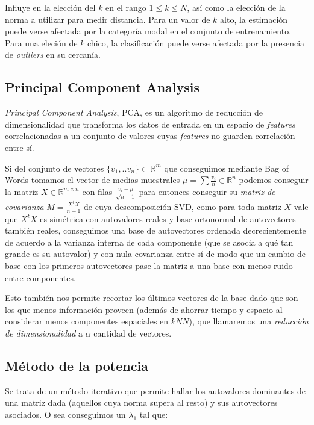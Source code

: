 Influye en \knn{} la elección del $k$ en el rango $1 \leq k \leq N$, así como
la elección de la norma a utilizar para medir distancia.
Para un valor de $k$ alto, la estimación puede verse afectada por la categoría
modal en el conjunto de entrenamiento.
Para una eleción de $k$ chico, la clasificación puede verse afectada por la
presencia de \textit{outliers} en su cercanía.


\subsection{Principal Component Analysis}%
\label{sub:principal_component_analysis}

\textit{Principal Component Analysis}, PCA, es un algoritmo de reducción de
dimensionalidad que transforma los datos de entrada en un espacio de
\textit{features} correlacionadas a un conjunto de valores cuyas
\textit{features} no guarden correlación entre sí.


Si del conjunto de vectores $\{v_1,..v_n \} \subset \mathds{R}^m$ que
conseguimos mediante Bag of Words tomamos el vector de medias
muestrales $\mu = \sum \frac{v_i}{n} \in \mathds{R}^n $ podemos
conseguir la matriz $X \in \mathds{R}^{m\times n}$ con filas
$\frac{v_i-\mu}{\sqrt{n-1}}$ para entonces conseguir su \textit{matriz de
  covarianza} $M=\frac{X^t X}{n-1}$ de cuya descomposición SVD, como
para toda matriz $X$ vale que $X^t X$ es simétrica con autovalores
reales y base ortonormal de autovectores también reales, conseguimos
una base de autovectores ordenada decrecientemente de acuerdo a la
varianza interna de cada componente (que se asocia a qué tan grande es
su autovalor) y con nula covarianza entre sí de modo que un cambio de
base con los primeros autovectores pase la matriz a una base con menos
ruido entre componentes.

Esto también nos permite recortar los últimos vectores de la base dado
que son los que menos información proveen (además de ahorrar tiempo y
espacio al considerar menos componentes espaciales en $kNN$), que
llamaremos una \textit{reducción de dimensionalidad} a $\alpha$
cantidad de vectores.

\subsection{Método de la potencia}%
\label{sub:pm}
Se trata de un método iterativo que permite hallar los autovalores dominantes de
una matriz dada (aquellos cuya norma supera al resto) y sus autovectores
asociados. O sea conseguimos un $\lambda_1$ tal que:

